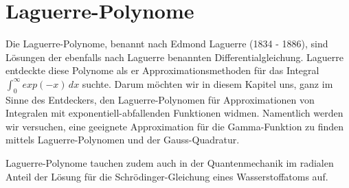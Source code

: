 %
%
%
\chapter{Laguerre-Polynome\label{chapter:laguerre}}
\begin{refsection}

{\parindent0pt Die} Laguerre\--Polynome, 
benannt nach Edmond Laguerre (1834 - 1886),
sind Lösungen der ebenfalls nach Laguerre benannten Differentialgleichung.
Laguerre entdeckte diese Polynome als er Approximationsmethoden 
für das Integral $\int_0^\infty exp(-x)\, dx$ suchte.
Darum möchten wir in diesem Kapitel uns, 
ganz im Sinne des Entdeckers,
den Laguerre-Polynomen für Approximationen von Integralen mit 
exponentiell-abfallenden Funktionen widmen.
Namentlich werden wir versuchen, 
eine geeignete Approximation für die Gamma-Funktion zu finden 
mittels Laguerre-Polynomen und der Gauss-Quadratur.

Laguerre-Polynome tauchen zudem auch in der Quantenmechanik im radialen Anteil 
der Lösung für die Schrödinger-Gleichung eines Wasserstoffatoms auf.





% 
% 

\printbibliography[heading=subbibliography]
\end{refsection}
